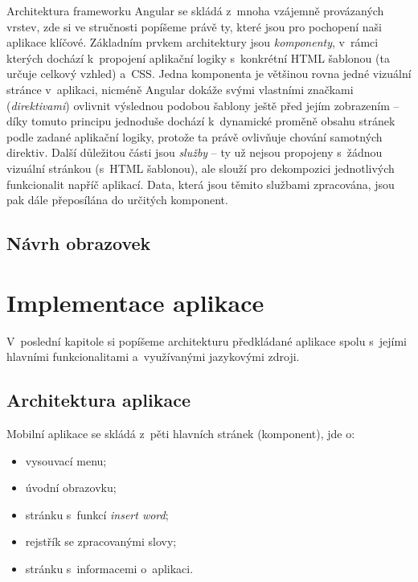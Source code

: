 Architektura frameworku Angular se skládá z~mnoha vzájemně provázaných
vrstev, zde si ve stručnosti popíšeme právě ty, které jsou pro pochopení
naši aplikace klíčové. Základním prvkem architektury jsou
\emph{komponenty}, v~rámci kterých dochází k~propojení aplikační logiky
s~konkrétní HTML šablonou (ta určuje celkový vzhled) a~CSS. Jedna
komponenta je většinou rovna jedné vizuální stránce v~aplikaci, nicméně
Angular dokáže svými vlastními značkami (\emph{direktivami}) ovlivnit
výslednou podobou šablony ještě před jejím zobrazením -- díky tomuto
principu jednoduše dochází k~dynamické proměně obsahu stránek podle
zadané aplikační logiky, protože ta právě ovlivňuje chování samotných
direktiv. Další důležitou části jsou \emph{služby} -- ty už nejsou
propojeny s~žádnou vizuální stránkou (s~HTML šablonou), ale slouží pro
dekompozici jednotlivých funkcionalit napříč aplikací. Data, která jsou
těmito službami zpracována, jsou pak dále přeposílána do určitých
komponent.~\parencite{angulararchitecture}

\hypertarget{nuxe1vrh-obrazovek}{%
\subsection{Návrh obrazovek}\label{nuxe1vrh-obrazovek}}

\hypertarget{implementace-aplikace}{%
\section{Implementace aplikace}\label{implementace-aplikace}}

V~poslední kapitole si popíšeme architekturu předkládané aplikace spolu
s~jejími hlavními funkcionalitami a~využívanými jazykovými zdroji.

\hypertarget{architektura-aplikace}{%
\subsection{Architektura aplikace}\label{architektura-aplikace}}

Mobilní aplikace se skládá z~pěti hlavních stránek (komponent), jde o:

\begin{itemize}
\tightlist
\item
  vysouvací menu;
\item
  úvodní obrazovku;
\item
  stránku s~funkcí \emph{insert word};
\item
  rejstřík se zpracovanými slovy;
\item
  stránku s~informacemi o~aplikaci.
\end{itemize}

